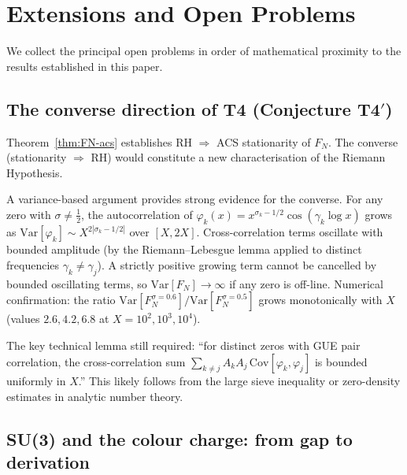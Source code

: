 \documentclass[12pt,a4paper]{article}
\theoremstyle{plain}
\theoremstyle{definition}
\theoremstyle{remark}
\begin{document}
\section{Extensions and Open Problems}
\label{sec:open}

We collect the principal open problems in order of mathematical proximity
to the results established in this paper.

\subsection{The converse direction of T4 (Conjecture T4$'$)}

Theorem~\ref{thm:FN-acs} establishes RH $\Rightarrow$ ACS stationarity of $F_N$.
The converse (stationarity $\Rightarrow$ RH) would constitute a new
characterisation of the Riemann Hypothesis.

A variance-based argument provides strong evidence for the converse.
For any zero with $\sigma \neq \tfrac{1}{2}$, the autocorrelation
of $\varphi_k(x) = x^{\sigma_k - 1/2}\cos(\gamma_k\log x)$
grows as $\mathrm{Var}[\varphi_k] \sim X^{2|\sigma_k - 1/2|}$ over $[X, 2X]$.
Cross-correlation terms oscillate with bounded amplitude (by the
Riemann--Lebesgue lemma applied to distinct frequencies $\gamma_k \neq \gamma_j$).
A strictly positive growing term cannot be cancelled by bounded oscillating
terms, so $\mathrm{Var}[F_N] \to \infty$ if any zero is off-line.
Numerical confirmation: the ratio $\mathrm{Var}[F_N^{\sigma=0.6}] / \mathrm{Var}[F_N^{\sigma=0.5}]$
grows monotonically with $X$ (values $2.6, 4.2, 6.8$ at $X = 10^2, 10^3, 10^4$).

The key technical lemma still required: ``for distinct zeros with GUE pair
correlation, the cross-correlation sum $\sum_{k \neq j} A_k A_j\,\mathrm{Cov}[\varphi_k, \varphi_j]$
is bounded uniformly in $X$.''  This likely follows from the large sieve
inequality or zero-density estimates in analytic number theory.

\subsection{SU(3) and the colour charge: from gap to derivation}
\end{document}
